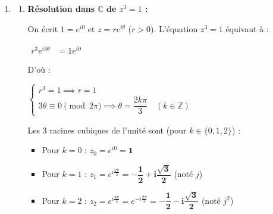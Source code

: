 \documentclass[12pt,a4paper]{article}
\begin{document}
\begin{enumerate}
    $
    \begin{aligned}
        z_k &= \sqrt{2} e^{i\left(\frac{\pi}{8} + \frac{k\pi}{3}\right)}
    \end{aligned}
    $
    
    Soit explicitement :
    \begin{itemize}
        \item Pour $k = 0$ : $\mathbf{z_0 = \sqrt{2} e^{i\frac{\pi}{8}}}$
        \item Pour $k = 1$ : $\mathbf{z_1 = \sqrt{2} e^{i\frac{11\pi}{24}}}$
        \item Pour $k = 2$ : $\mathbf{z_2 = \sqrt{2} e^{i\frac{19\pi}{24}}}$
        \item Pour $k = 3$ : $\mathbf{z_3 = \sqrt{2} e^{i\frac{27\pi}{24}} = \sqrt{2} e^{-i\frac{7\pi}{8}}}$
        \item Pour $k = 4$ : $\mathbf{z_4 = \sqrt{2} e^{i\frac{35\pi}{24}} = \sqrt{2} e^{-i\frac{13\pi}{24}}}$
        \item Pour $k = 5$ : $\mathbf{z_5 = \sqrt{2} e^{i\frac{43\pi}{24}} = \sqrt{2} e^{-i\frac{5\pi}{24}}}$
    \end{itemize}

    \item 
    \begin{enumerate}
        \item \textbf{Résolution dans $\mathbb{C}$ de $z^3 = 1$ :}
        
        On écrit $1 = e^{i0}$ et $z = r e^{i\theta}$ ($r > 0$). L'équation $z^3 = 1$ équivaut à :
        
        $
        \begin{aligned}
            r^3 e^{i3\theta} &= 1 e^{i0}
        \end{aligned}
        $
        
        D'où :
        
        $
        \begin{cases}
            r^3 = 1 \implies r = 1 \\
            3\theta \equiv 0 \pmod{2\pi} \implies \theta = \dfrac{2k\pi}{3} \quad (k \in \mathbb{Z})
        \end{cases}
        $
        
        Les $3$ racines cubiques de l'unité sont (pour $k \in \{0, 1, 2\}$) :
        \begin{itemize}
            \item Pour $k = 0$ : $z_0 = e^{i0} = \mathbf{1}$
            \item Pour $k = 1$ : $z_1 = e^{i\frac{2\pi}{3}} = \mathbf{-\dfrac{1}{2} + i\dfrac{\sqrt{3}}{2}}$ (noté $j$)
            \item Pour $k = 2$ : $z_2 = e^{i\frac{4\pi}{3}} = e^{-i\frac{2\pi}{3}} = \mathbf{-\dfrac{1}{2} - i\dfrac{\sqrt{3}}{2}}$ (noté $j^2$)
        \end{itemize}
        

\end{enumerate}
\end{enumerate}
\end{document}

